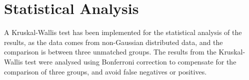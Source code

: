 \section{Statistical Analysis} \label{sec:statistics}

A Kruskal-Wallis test has been implemented for the statistical analysis of the results, as the data comes from non-Gaussian distributed data, and the comparison is between three unmatched groups. The results from the Kruskal-Wallis test were analysed using Bonferroni correction to compensate for the comparison of three groups, and avoid false negatives or positives.